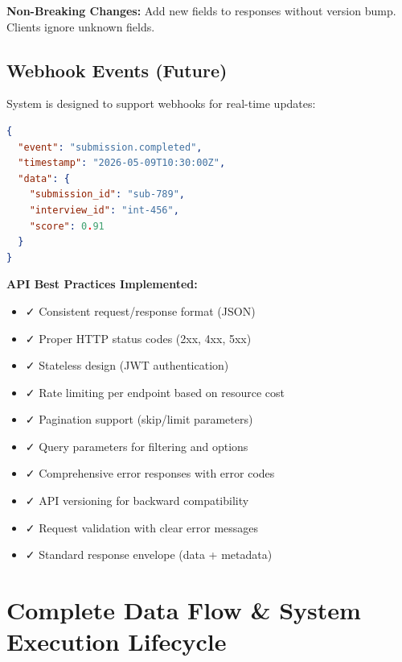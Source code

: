 \documentclass[12pt,a4paper,oneside]{article}
\begin{document}
\textbf{Non-Breaking Changes:} Add new fields to responses without version bump. Clients ignore unknown fields.

\subsection{Webhook Events (Future)}

System is designed to support webhooks for real-time updates:

\begin{lstlisting}[language=JSON, caption=Webhook Payload Example (Future)]
{
  "event": "submission.completed",
  "timestamp": "2026-05-09T10:30:00Z",
  "data": {
    "submission_id": "sub-789",
    "interview_id": "int-456",
    "score": 0.91
  }
}
\end{lstlisting}

\begin{importantbox}
\textbf{API Best Practices Implemented:}

\begin{itemize}
    \item ✓ Consistent request/response format (JSON)
    \item ✓ Proper HTTP status codes (2xx, 4xx, 5xx)
    \item ✓ Stateless design (JWT authentication)
    \item ✓ Rate limiting per endpoint based on resource cost
    \item ✓ Pagination support (skip/limit parameters)
    \item ✓ Query parameters for filtering and options
    \item ✓ Comprehensive error responses with error codes
    \item ✓ API versioning for backward compatibility
    \item ✓ Request validation with clear error messages
    \item ✓ Standard response envelope (data + metadata)
\end{itemize}
\end{importantbox}

\newpage


\section{Complete Data Flow \& System Execution Lifecycle}
\end{document}

